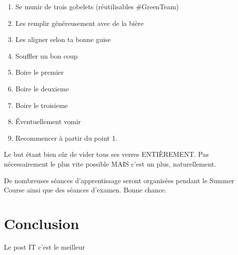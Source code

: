 \documentclass[12pt]{article}
\begin{document}
		\begin{enumerate}
			\item Se munir de trois gobelets (réutilisables \#GreenTeam) 
			\item Les remplir généreusement avec de la bière
			\item Les aligner selon ta bonne guise 
			\item Souffler un bon coup 
			\item Boire le premier 
			\item Boire le deuxieme
			\item Boire le troisieme
			\item Éventuellement vomir
			\item Recommencer à partir du point 1. 

		\end{enumerate}
		
		Le but étant bien sûr de vider tous ses verres ENTIÈREMENT. Pas nécessairement le plus vite possible MAIS c’est un plus, naturellement.   


		De nombreuses séances d'apprentissage seront organisées pendant le Summer Course ainsi que des séances d’examen. Bonne chance. 


\section{Conclusion}
	Le post IT c'est le meilleur
		
		
\end{document}
